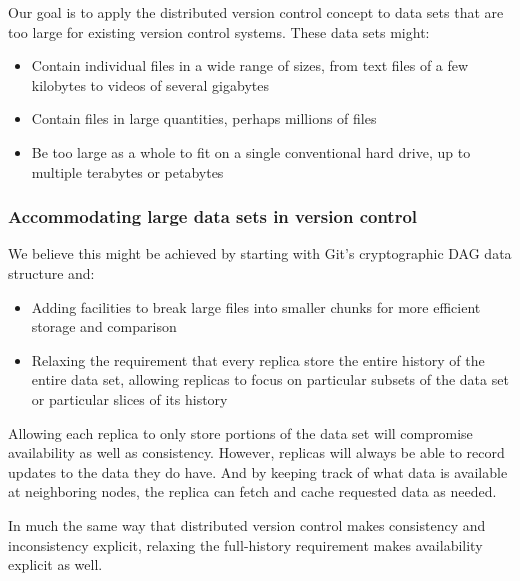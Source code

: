 \documentclass[a4paper]{article}
\begin{document}
Our goal is to apply the distributed version control concept to data sets that
are too large for existing version control systems.
These data sets might:

\begin{itemize}

  \item Contain individual files in a wide range of sizes, from text files of a
    few kilobytes to videos of several gigabytes

  \item Contain files in large quantities, perhaps millions of files

  \item Be too large as a whole to fit on a single conventional hard drive, up
    to multiple terabytes or petabytes

\end{itemize}

\subsubsection{Accommodating large data sets in version control}

We believe this might be achieved by starting with Git's cryptographic DAG data
structure and:

\begin{itemize}

  \item Adding facilities to break large files into smaller chunks for more
    efficient storage and comparison

  \item Relaxing the requirement that every replica store the entire history of
    the entire data set, allowing replicas to focus on particular subsets of the
    data set or particular slices of its history

\end{itemize}

Allowing each replica to only store portions of the data set will compromise
availability as well as consistency.
However, replicas will always be able to record updates to the data they do
have.
And by keeping track of what data is available at neighboring nodes, the replica
can fetch and cache requested data as needed.

In much the same way that distributed version control makes consistency and
inconsistency explicit, relaxing the full-history requirement makes availability
explicit as well.
\end{document}
